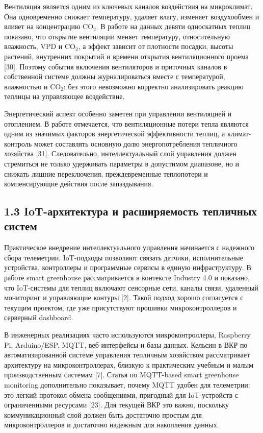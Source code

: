 \documentclass[a4paper,14pt]{extarticle}
\begin{document}
Вентиляция является одним из ключевых каналов воздействия на
микроклимат. Она одновременно снижает температуру, удаляет влагу,
изменяет воздухообмен и влияет на концентрацию CO\(_2\). В работе на
данных девяти односкатных теплиц показано, что открытие вентиляции
меняет температуру, относительную влажность, VPD и CO\(_2\), а эффект
зависит от плотности посадки, высоты растений, внутренних покрытий и
времени открытия вентиляционного проема {[}30{]}. Поэтому события
включения вентиляторов и приточных каналов в собственной системе должны
журналироваться вместе с температурой, влажностью и CO\(_2\): без этого
невозможно корректно анализировать реакцию теплицы на управляющее
воздействие.

Энергетический аспект особенно заметен при управлении вентиляцией и
отоплением. В работе отмечается, что вентиляционные потери тепла
являются одним из значимых факторов энергетической эффективности теплиц,
а климат-контроль может составлять основную долю энергопотребления
тепличного хозяйства {[}31{]}. Следовательно, интеллектуальный слой
управления должен стремиться не только удерживать параметры в допустимом
диапазоне, но и снижать лишние переключения, преждевременные теплопотери
и компенсирующие действия после запаздывания.

\hypertarget{iot-ux430ux440ux445ux438ux442ux435ux43aux442ux443ux440ux430-ux438-ux440ux430ux441ux448ux438ux440ux44fux435ux43cux43eux441ux442ux44c-ux442ux435ux43fux43bux438ux447ux43dux44bux445-ux441ux438ux441ux442ux435ux43c}{%
\subsection{1.3 IoT-архитектура и расширяемость тепличных
систем}\label{iot-ux430ux440ux445ux438ux442ux435ux43aux442ux443ux440ux430-ux438-ux440ux430ux441ux448ux438ux440ux44fux435ux43cux43eux441ux442ux44c-ux442ux435ux43fux43bux438ux447ux43dux44bux445-ux441ux438ux441ux442ux435ux43c}}

Практическое внедрение интеллектуального управления начинается с
надежного сбора телеметрии. IoT-подходы позволяют связать датчики,
исполнительные устройства, контроллеры и программные сервисы в единую
инфраструктуру. В работе smart greenhouse рассматривается в контексте
Industry 4.0 и показано, что IoT-системы для теплиц включают сенсорные
сети, каналы связи, удаленный мониторинг и управляющие контуры {[}2{]}.
Такой подход хорошо согласуется с текущим проектом, где уже присутствуют
прошивки микроконтроллеров и серверный dashboard.

В инженерных реализациях часто используются микроконтроллеры, Raspberry
Pi, Arduino/ESP, MQTT, веб-интерфейсы и базы данных. Кельсин в ВКР по
автоматизированной системе управления тепличным хозяйством рассматривает
архитектуру на микроконтроллерах, близкую к практическим учебным и малым
производственным системам {[}7{]}. Статья по MQTT-based smart greenhouse
monitoring дополнительно показывает, почему MQTT удобен для телеметрии:
это легкий протокол обмена сообщениями, пригодный для IoT-устройств с
ограниченными ресурсами {[}23{]}. Для текущей ВКР это важно, поскольку
коммуникационный слой должен быть достаточно простым для
микроконтроллеров и достаточно надежным для накопления данных.
\end{document}
